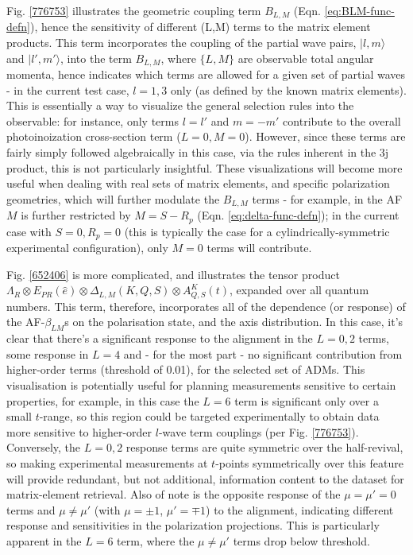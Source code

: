 \documentclass[10pt]{article}
\begin{document}
Fig. \ref{776753} illustrates the geometric coupling term $B_{L,M}$ (Eqn. \ref{eq:BLM-func-defn}), hence the sensitivity of different (L,M) terms to the matrix element products. This term incorporates the coupling of the partial wave pairs, $|l,m\rangle$ and $|l',m'\rangle$, into the term $B_{L,M}$, where $\{L,M\}$ are observable total angular momenta, 
hence indicates which terms are allowed for a given set of partial waves - in the current test case, $l=1,3$ only (as defined by the known matrix elements). This is essentially a way to visualize the general selection rules into the observable: for instance, only terms $l=l'$ and $m=-m'$ contribute to the overall photoinoization cross-section term ($L=0, M=0$). However, since these terms are fairly simply followed algebraically in this case, via the rules inherent in the 3j product, this is not particularly insightful. These visualizations will become more useful when dealing with real sets of matrix elements, and specific polarization geometries, which will further modulate the $B_{L,M}$ terms - for example, in the AF $M$ is further restricted by $M = S-R_{p}$ (Eqn. \ref{eq:delta-func-defn}); in the current case with $S=0, R_p=0$ (this is typically the case for a cylindrically-symmetric experimental configuration), only $M=0$ terms will contribute.

Fig. \ref{652406} is more complicated, and illustrates the tensor product $\Lambda_{R}\otimes E_{PR}(\hat{e})\otimes \Delta_{L,M}(K,Q,S)\otimes A^{K}_{Q,S}(t)$, expanded over all quantum numbers.
This term, therefore, incorporates all of the dependence (or response) of the AF-$\beta_{LM}$s on the polarisation state, and the axis distribution. In this case, it's clear that there's a significant response to the alignment in the $L=0,2$ terms, some response in $L=4$ and - for the most part - no significant contribution from higher-order terms (threshold of 0.01), for the selected set of ADMs. This visualisation is potentially useful for planning measurements sensitive to certain properties, for example, in this case the $L=6$ term is significant only over a small $t$-range, so this region could be targeted experimentally to obtain data more sensitive to higher-order $l$-wave term couplings (per Fig. \ref{776753}). Conversely, the $L=0,2$ response terms are quite symmetric over the half-revival, so making experimental measurements at $t$-points symmetrically over this feature will provide redundant, but not additional, information content to the dataset for matrix-element retrieval. Also of note is the opposite response of the $\mu=\mu'=0$ terms and $\mu\neq\mu'$ (with $\mu=\pm1$, $\mu'=\mp1$) to the alignment, indicating different response and sensitivities in the polarization projections. This is particularly apparent in the $L=6$ term, where the $\mu\neq\mu'$ terms drop below threshold.
\end{document}

